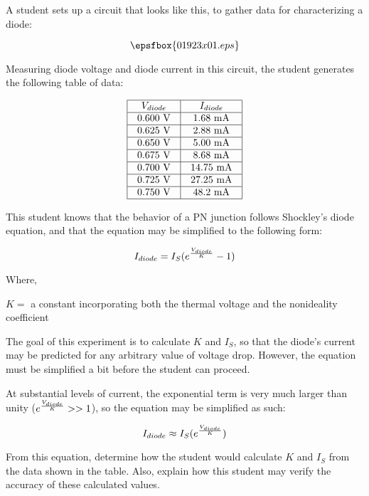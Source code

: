 

A student sets up a circuit that looks like this, to gather data for characterizing a diode:

$$\epsfbox{01923x01.eps}$$

Measuring diode voltage and diode current in this circuit, the student generates the following table of data:


$$\vbox{\offinterlineskip
\halign{\strut
\vrule \quad\hfil # \ \hfil & 
\vrule \quad\hfil # \ \hfil \vrule \cr
\noalign{\hrule}
%
$V_{diode}$ & $I_{diode}$ \cr
%
\noalign{\hrule}
%
0.600 V & 1.68 mA \cr
%
\noalign{\hrule}
%
0.625 V & 2.88 mA \cr
%
\noalign{\hrule}
%
0.650 V & 5.00 mA \cr
%
\noalign{\hrule}
%
0.675 V & 8.68 mA \cr
%
\noalign{\hrule}
%
0.700 V & 14.75 mA \cr
%
\noalign{\hrule}
%
0.725 V & 27.25 mA \cr
%
\noalign{\hrule}
%
0.750 V & 48.2 mA \cr
%
\noalign{\hrule}
} %
}$$ %

This student knows that the behavior of a PN junction follows Shockley's diode equation, and that the equation may be simplified to the following form:

$$I_{diode} = I_S (e^{V_{diode} \over K} - 1)$$

\noindent
Where,

$K = $ a constant incorporating both the thermal voltage and the nonideality coefficient

\vskip 10pt

The goal of this experiment is to calculate $K$ and $I_S$, so that the diode's current may be predicted for any arbitrary value of voltage drop.  However, the equation must be simplified a bit before the student can proceed.

At substantial levels of current, the exponential term is very much larger than unity ($e^{V_{diode} \over K} >> 1$), so the equation may be simplified as such:

$$I_{diode} \approx I_S (e^{V_{diode} \over K})$$

From this equation, determine how the student would calculate $K$ and $I_S$ from the data shown in the table.  Also, explain how this student may verify the accuracy of these calculated values.

